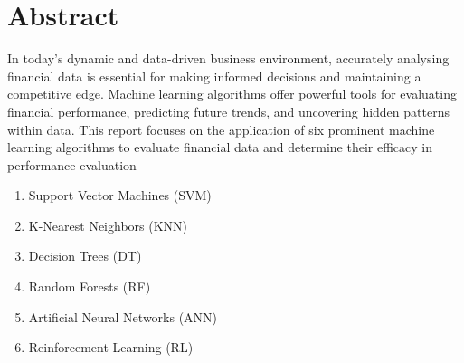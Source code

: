\documentclass[12pt,a4paper]{report}
\begin{document}
\tableofcontents

\clearpage

\setcounter{page}{1}

\chapter*{Abstract}
\begin{spacing}{1.5}
In today’s dynamic and data-driven business environment, accurately analysing financial data is essential for making informed decisions and maintaining a competitive edge. Machine learning algorithms offer powerful tools for evaluating financial performance, predicting future trends, and uncovering hidden patterns within data. This report focuses on the application of six prominent machine learning algorithms to evaluate financial data and determine their efficacy in performance evaluation - 
\begin{enumerate}
    \item Support Vector Machines (SVM)
    \item K-Nearest Neighbors (KNN)
    \item Decision Trees (DT)
    \item Random Forests (RF)
    \item Artificial Neural Networks (ANN)
    \item Reinforcement Learning (RL)
\end{enumerate}

\end{spacing}
\clearpage


\end{document}
